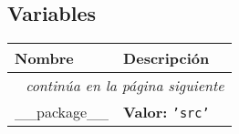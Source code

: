   \subsection{Variables}

    \vspace{-1cm}
\hspace{\varindent}\begin{longtable}{|p{\varnamewidth}|p{\vardescrwidth}|l}
\cline{1-2}
\cline{1-2} \centering \textbf{Nombre} & \centering \textbf{Descripción}& \\
\cline{1-2}
\endhead\cline{1-2}\multicolumn{3}{r}{\small\textit{continúa en la página siguiente}}\\\endfoot\cline{1-2}
\endlastfoot\raggedright \_\-\_\-p\-a\-c\-k\-a\-g\-e\-\_\-\_\- & \raggedright \textbf{Valor:} 
{\tt \texttt{'}\texttt{src}\texttt{'}}&\\
\cline{1-2}
\end{longtable}

